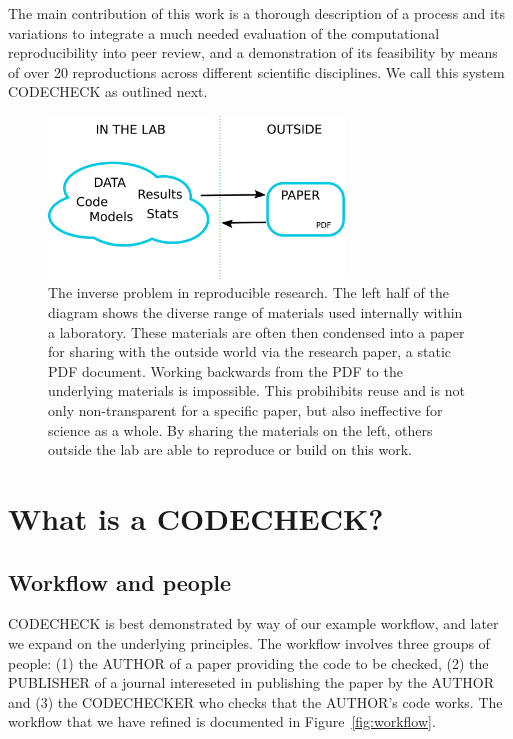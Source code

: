 \documentclass[12pt]{article}
\begin{document}
The main contribution of this work is a thorough description of a process
and its variations to integrate a much needed evaluation of the 
computational reproducibility \cite{barba_terminologies_2018} into peer
review, and a demonstration of its feasibility by means of over 20
reproductions across different scientific disciplines.
We call this system CODECHECK as outlined next.

\begin{figure}
  \centering
  \includegraphics[width=0.7\textwidth]{figs/rr.pdf}
  \caption{The inverse problem in reproducible research.  The left
  half of the diagram shows the diverse range of materials used
  internally within a laboratory.  These materials are often then
  condensed into a paper for sharing with the outside world via the
  research paper, a static PDF document.  Working backwards from the
  PDF to the underlying materials is impossible. This probihibits reuse
  and is not only non-transparent for a specific paper, but also 
  ineffective for science as a whole. By sharing the
  materials on the left, others outside the lab are able to reproduce
  or build on this work.}
  \label{fig:inverse}
\end{figure}

\section*{What is a CODECHECK?}\label{what-is-a-codecheck}

\subsection*{Workflow and people}\label{workflow-people}

CODECHECK is best demonstrated by way of our example workflow, and later
we expand on the underlying principles. The workflow involves three
groups of people: (1) the AUTHOR of a paper providing the code to be checked, (2)
the PUBLISHER of a journal intereseted in publishing the paper by the
AUTHOR and (3) the CODECHECKER who checks that the AUTHOR's code works.
The workflow that we have refined is documented in Figure~\ref{fig:workflow}.
\end{document}
